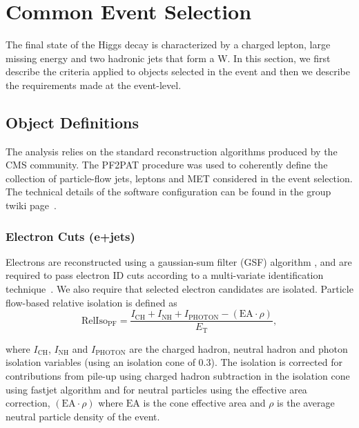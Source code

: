 \section{Common Event Selection}
\label{sec:firstStep}

The final state of the Higgs decay is characterized by a charged lepton, 
large missing energy and two hadronic jets that form a W.
In this section, we first describe the criteria applied to objects
selected in the event and then we describe the requirements made at
the event-level.

\subsection{Object Definitions}

The analysis relies on the standard reconstruction algorithms produced
by the CMS community. 
The PF2PAT procedure was used to coherently define the collection of particle-flow jets, leptons and
MET considered in the event selection.  
The technical details of the software configuration can be found in the group twiki page~\cite{WG_PATtuple_twiki}. 

\subsubsection{Electron Cuts (e+jets)}
\label{sec:electron_cuts}

Electrons are reconstructed using a gaussian-sum filter (GSF)
algorithm \cite{CMS-PAS-EGM-10-004}, and are required to pass electron
ID cuts according to a multi-variate identification
technique~\cite{cite:elemva}.  We also require that selected
electron candidates are isolated. Particle flow-based relative
isolation is defined as
\begin{equation*}
\mathrm{RelIso_{\mathrm{PF}}} = \frac{I_{\mathrm{CH}}+I_{\mathrm{NH}}+I_{\mathrm{PHOTON}}-(\mathrm{EA}\cdot\rho)}{E_\mathrm{T}},
\end{equation*} 

where $I_{\mathrm{CH}}$, $I_{\mathrm{NH}}$ and $I_{\mathrm{PHOTON}}$
are the charged hadron, neutral hadron and photon isolation variables
(using an isolation cone of 0.3). The isolation is corrected for
contributions from pile-up using charged hadron subtraction in the
isolation cone using fastjet algorithm \cite{FastJetPUSubtraction} and
for neutral particles using the effective area correction,
$(\mathrm{EA}\cdot\rho)$ where $\mathrm{EA}$ is the cone effective area
and $\rho$ is the average neutral particle density of the event.


